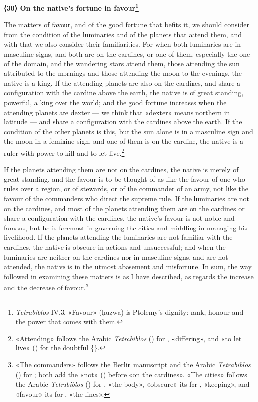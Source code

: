 \documentclass[11pt]{article}
\newcommand{\Fol}[1]{\marginpar{\footnotesize\color{gray}f.\,#1}}
\newcommand{\ChapterHead}[4]{\par\needspace{8\baselineskip}\bigskip\pdfbookmark[1]{#1}{ch-#2}\hypertarget{EN-K#2}{}%
 {\large\bfseries\interlinepenalty=10000 #1#4{\normalfont\normalsize#3}\par}\nobreak\medskip}
\begin{document}
\ChapterHead{{\mdseries ⟨}30{\mdseries ⟩} On the native's fortune in favour}{30}{}{\footnote{\emph{Tetrabiblos} IV.3. «Favour» (ḥuẓwa) is Ptolemy's dignity: rank, honour and the power that comes with them.}}
\par \Fol{64r}The matters of favour, and of the good fortune that befits it, we should consider from the condition of the luminaries and of the planets that attend them, and with that we also consider their familiarities. For when both luminaries are in masculine signs, and both are on the cardines, or one of them, especially the one of the domain, and the wandering stars attend them, those attending the sun attributed to the mornings and those attending the moon to the evenings, the native is a king. If the attending planets are also on the cardines, and share a configuration with the cardine above the earth, the native is of great standing, powerful, a king over the world; and the good fortune increases when the attending planets are dexter — we think that «dexter» means northern in latitude — and share a configuration with the cardines above the earth. If the condition of the other planets is this, but the sun alone is in a masculine sign and the moon in a feminine sign, and one of them is on the cardine, the native is a ruler with power to kill and to let live.\footnote{«Attending» follows the Arabic \emph{Tetrabiblos} () for , «differing», and «to let live» () for the doubtful \{\}.}\par
\par \Fol{64v}If the planets attending them are not on the cardines, the native is merely of great standing, and the favour is to be thought of as like the favour of one who rules over a region, or of stewards, or of the commander of an army, not like the favour of the commanders who direct the supreme rule. If the luminaries are not on the cardines, and most of the planets attending them are on the cardines or share a configuration with the cardines, the native's favour is not noble and famous, but he is foremost in governing the cities and middling in managing his livelihood. If the planets attending the luminaries are not familiar with the cardines, the native is obscure in actions and unsuccessful; and when the luminaries are neither on the cardines nor in masculine signs, and are not attended, the native is in the utmost abasement and misfortune. In sum, the way followed in examining these matters is as I have described, as regards the increase and the decrease of favour.\footnote{«The commanders» follows the Berlin manuscript and the Arabic \emph{Tetrabiblos} () for ; both add the «not» () before «on the cardines». «The cities» follows the Arabic \emph{Tetrabiblos} () for , «the body», «obscure» its  for , «keeping», and «favour» its  for , «the lines».}\par
\end{document}

